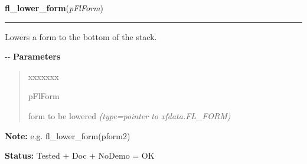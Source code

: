 \hspace{.8\funcindent}\begin{boxedminipage}{\funcwidth}

    \raggedright \textbf{fl\_lower\_form}(\textit{pFlForm})

    \vspace{-1.5ex}

    \rule{\textwidth}{0.5\fboxrule}
\setlength{\parskip}{2ex}

Lowers a form to the bottom of the stack.

-{}-
\setlength{\parskip}{1ex}
      \textbf{Parameters}
      \vspace{-1ex}

      \begin{quote}
        \begin{Ventry}{xxxxxxx}

          \item[pFlForm]


form to be lowered
            {\it (type=pointer to xfdata.FL\_FORM)}

        \end{Ventry}

      \end{quote}

\textbf{Note:} 
e.g. fl\_lower\_form(pform2)


\textbf{Status:} 
Tested + Doc + NoDemo = OK


    \end{boxedminipage}

    \label{xformslib:flxbasic:fl_set_foreground}

    \vspace{0.5ex}

